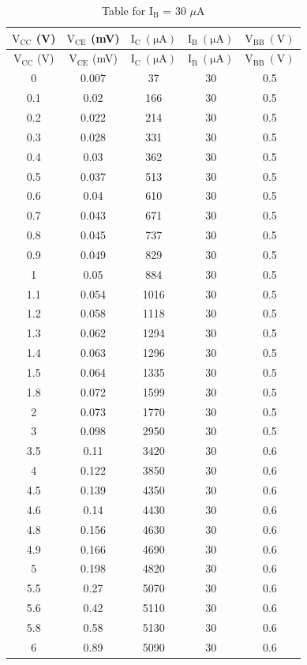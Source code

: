 \documentclass[12pt]{article}
\begin{document}
\begin{longtable}[H]{|c|c|c|c|c|}
    \caption{Table for \( \mathrm{I_B}\) = 30 \( \mu \)A }
    \endfirsthead
    \hline
    $\mathrm{V_{CC}}$ (V) & $\mathrm{V_{CE}}$ (mV) & $\mathrm{I_C \ (\mu A)}$ & $\mathrm{I_B \ (\mu A)}$ & $\mathrm{V_{BB} \ (V)}$ \\ \hline \hline
    \endhead 
    \hline
    $\mathrm{V_{CC}}$ (V) & $\mathrm{V_{CE}}$ (mV) & $\mathrm{I_C \ (\mu A)}$ & $\mathrm{I_B \ (\mu A)}$ & $\mathrm{V_{BB} \ (V)}$ \\ \hline \hline
        0   & 0.007 & 37   & 30 & 0.5 \\ \hline
        0.1 & 0.02  & 166  & 30 & 0.5 \\ \hline
        0.2 & 0.022 & 214  & 30 & 0.5 \\ \hline
        0.3 & 0.028 & 331  & 30 & 0.5 \\ \hline
        0.4 & 0.03  & 362  & 30 & 0.5 \\ \hline
        0.5 & 0.037 & 513  & 30 & 0.5 \\ \hline
        0.6 & 0.04  & 610  & 30 & 0.5 \\ \hline
        0.7 & 0.043 & 671  & 30 & 0.5 \\ \hline
        0.8 & 0.045 & 737  & 30 & 0.5 \\ \hline
        0.9 & 0.049 & 829  & 30 & 0.5 \\ \hline
        1   & 0.05  & 884  & 30 & 0.5 \\ \hline
        1.1 & 0.054 & 1016 & 30 & 0.5 \\ \hline
        1.2 & 0.058 & 1118 & 30 & 0.5 \\ \hline
        1.3 & 0.062 & 1294 & 30 & 0.5 \\ \hline
        1.4 & 0.063 & 1296 & 30 & 0.5 \\ \hline
        1.5 & 0.064 & 1335 & 30 & 0.5 \\ \hline
        1.8 & 0.072 & 1599 & 30 & 0.5 \\ \hline
        2   & 0.073 & 1770 & 30 & 0.5 \\ \hline
        3   & 0.098 & 2950 & 30 & 0.5 \\ \hline
        3.5 & 0.11  & 3420 & 30 & 0.6 \\ \hline
        4   & 0.122 & 3850 & 30 & 0.6 \\ \hline
        4.5 & 0.139 & 4350 & 30 & 0.6 \\ \hline
        4.6 & 0.14  & 4430 & 30 & 0.6 \\ \hline
        4.8 & 0.156 & 4630 & 30 & 0.6 \\ \hline
        4.9 & 0.166 & 4690 & 30 & 0.6 \\ \hline
        5   & 0.198 & 4820 & 30 & 0.6 \\ \hline
        5.5 & 0.27  & 5070 & 30 & 0.6 \\ \hline
        5.6 & 0.42  & 5110 & 30 & 0.6 \\ \hline
        5.8 & 0.58  & 5130 & 30 & 0.6 \\ \hline
        6   & 0.89  & 5090 & 30 & 0.6 \\ \hline
\end{longtable}
\end{document}
